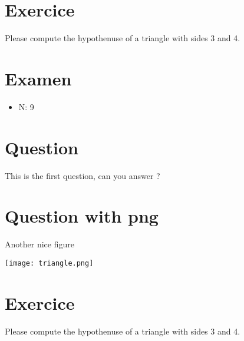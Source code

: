 \documentclass[a4paper,11pt,twoside]{article}
\begin{document}
\section*{Exercice}
\label{sec:org1d068b3}

Please compute the hypothenuse of a triangle with sides 3 and 4.



\subsection*{}
\label{sec:org4355dbd}

\cleardoublepage

\section*{Examen}
\label{sec:org08b0282}
\begin{itemize}
\item N: 9
\end{itemize}
\section*{Question}
\label{sec:orge6d40ad}

This is the first question, can you answer ?



\section*{Question with png}
\label{sec:orgd18de39}

Another nice figure

\begin{center}
\texttt{[image: triangle.png]}
\end{center}



\section*{Exercice}
\label{sec:orge2889f0}

Please compute the hypothenuse of a triangle with sides 3 and 4.



\subsection*{}
\label{sec:org3130f9f}
\end{document}
